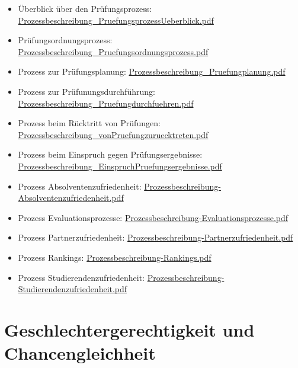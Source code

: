 \begin{itemize}
\tightlist
\item
  Überblick über den Prüfungsprozess:
  \href{../anhaenge/Prozessbeschreibung_PruefungsprozessUeberblick.pdf}{Prozessbeschreibung\_PruefungsprozessUeberblick.pdf}
\item
  Prüfungsordnungsprozess:
  \href{../anhaenge/Prozessbeschreibung_Pruefungsordnungsprozess.pdf}{Prozessbeschreibung\_Pruefungsordnungsprozess.pdf}
\item
  Prozess zur Prüfungsplanung:
  \href{../anhaenge/Prozessbeschreibung_Pruefungplanung.pdf}{Prozessbeschreibung\_Pruefungplanung.pdf}
\item
  Prozess zur Prüfunungsdurchführung:
  \href{../anhaenge/Prozessbeschreibung_Pruefungdurchfuehren.pdf}{Prozessbeschreibung\_Pruefungdurchfuehren.pdf}
\item
  Prozess beim Rücktritt von Prüfungen:
  \href{../anhaenge/Prozessbeschreibung_vonPruefungzuruecktreten.pdf}{Prozessbeschreibung\_vonPruefungzuruecktreten.pdf}
\item
  Prozess beim Einspruch gegen Prüfungsergebnisse:
  \href{../anhaenge/Prozessbeschreibung_EinspruchPruefungsergebnisse.pdf}{Prozessbeschreibung\_EinspruchPruefungsergebnisse.pdf}
\item
  Prozess Absolventenzufriedenheit:
  \href{../anhaenge/Prozessbeschreibung-Absolventenzufriedenheit.pdf}{Prozessbeschreibung-Absolventenzufriedenheit.pdf}
\item
  Prozess Evaluationsprozesse:
  \href{../anhaenge/Prozessbeschreibung-Evaluationsprozesse.pdf}{Prozessbeschreibung-Evaluationsprozesse.pdf}
\item
  Prozess Partnerzufriedenheit:
  \href{../anhaenge/Prozessbeschreibung-Partnerzufriedenheit.pdf}{Prozessbeschreibung-Partnerzufriedenheit.pdf}
\item
  Prozess Rankings:
  \href{../anhaenge/Prozessbeschreibung-Rankings.pdf}{Prozessbeschreibung-Rankings.pdf}
\item
  Prozess Studierendenzufriedenheit:
  \href{../anhaenge/Prozessbeschreibung-Studierendenzufriedenheit.pdf}{Prozessbeschreibung-Studierendenzufriedenheit.pdf}
\end{itemize}

\chapter{Geschlechtergerechtigkeit und
Chancengleichheit}\label{geschlechtergerechtigkeit-und-chancengleichheit}

